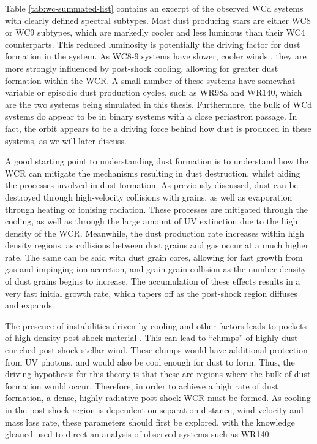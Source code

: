 Table \ref{tab:wc-summated-list} contains an excerpt of the observed WCd systems with clearly defined spectral subtypes.
Most dust producing stars are either WC8 or WC9 subtypes, which are markedly cooler and less luminous than their WC4 counterparts.
This reduced luminosity is potentially the driving factor for dust formation in the system.
As WC8-9 systems have slower, cooler winds \parencite{niedzielskiKinematicalStructureWolfRayet2002}, they are more strongly influenced by post-shock cooling, allowing for greater dust formation within the WCR.
A small number of these systems have somewhat variable or episodic dust production cycles, such as WR98a and WR140, which are the two systems being simulated in this thesis.
Furthermore, the bulk of WCd systems do appear to be in binary systems with a close periastron passage.
In fact, the orbit appears to be a driving force behind how dust is produced in these systems, as we will later discuss.

A good starting point to understanding dust formation is to understand how the WCR can mitigate the mechanisms resulting in dust destruction, whilst aiding the processes involved in dust formation.
As previously discussed, dust can be destroyed through high-velocity collisions with grains, as well as evaporation through heating or ionising radiation.
These processes are mitigated through the cooling, as well as through the large amount of UV extinction due to the high density of the WCR.
Meanwhile, the dust production rate increases within high density regions, as collisions between dust grains and gas occur at a much higher rate.
The same can be said with dust grain cores, allowing for fast growth from gas and impinging ion accretion, and grain-grain collision as the number density of dust grains begins to increase.
The accumulation of these effects results in a very fast initial growth rate, which tapers off as the post-shock region diffuses and expands.

The presence of instabilities driven by cooling and other factors leads to pockets of high density post-shock material \parencite{stevens_colliding_1992}.
This can lead to ``clumps'' of highly dust-enriched post-shock stellar wind.
These clumps would have additional protection from UV photons, and would also be cool enough for dust to form.
Thus, the driving hypothesis for this theory is that these are regions where the bulk of dust formation would occur.
Therefore, in order to achieve a high rate of dust formation, a dense, highly radiative post-shock WCR must be formed.
As cooling in the post-shock region is dependent on separation distance, wind velocity and mass loss rate, these parameters should first be explored, with the knowledge gleaned used to direct an analysis of observed systems such as WR140.

